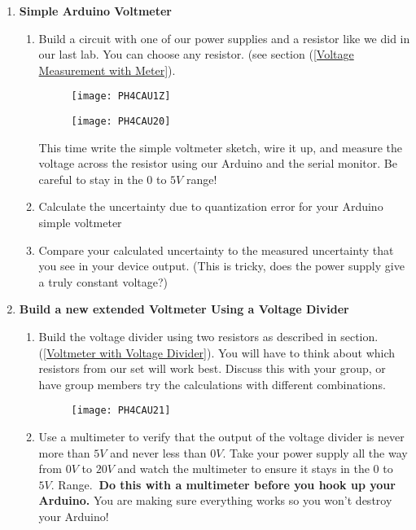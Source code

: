 \begin{enumerate}
	\item \textbf{Simple Arduino Voltmeter}

	\begin{enumerate}
		\item Build a circuit with one of our power supplies and a resistor like we did in our last lab. You can choose any resistor. (see section (\ref{Voltage Measurement with Meter}). 
			\begin{figure}[h!]
				\centering
				\texttt{[image: PH4CAU1Z]}
			\end{figure}

			
			\begin{figure}[h!]
				\centering
				\texttt{[image: PH4CAU20]}
			\end{figure}

			This time write the simple voltmeter sketch, wire it up, and measure the voltage across the resistor using our Arduino and the serial monitor. Be careful to stay in the $0$ to $5\unit{V}$ range!

		\item Calculate the uncertainty due to quantization error for your Arduino
			simple voltmeter

		\item Compare your calculated uncertainty to the measured uncertainty that
			you see in your device output. (This is tricky, does the power supply give a truly constant voltage?)
	\end{enumerate}

	\item \textbf{Build a new extended Voltmeter Using a Voltage Divider}

		\begin{enumerate}
			\item Build the voltage divider using two resistors as described in  section. (\ref{Voltmeter with Voltage Divider}). You will have to think about which resistors from our set will work best. Discuss this with your group, or have group members try the calculations with different combinations.
			
			\begin{figure}[h!]
				\centering
				\texttt{[image: PH4CAU21]}
			\end{figure}

			\item Use a multimeter to verify that the output of the voltage divider is
			never more than $5\unit{V}$ and never less than $0\unit{V}.$ Take your power supply all the way from $0\unit{V}$ to $20\unit{V}$ and watch the multimeter to ensure it stays in the $0$ to $5\unit{V}.$ Range.\textbf{\ Do this with a multimeter before you hook up your Arduino.} You are making sure everything works so you won't destroy your Arduino!


\end{enumerate}
\end{enumerate}
